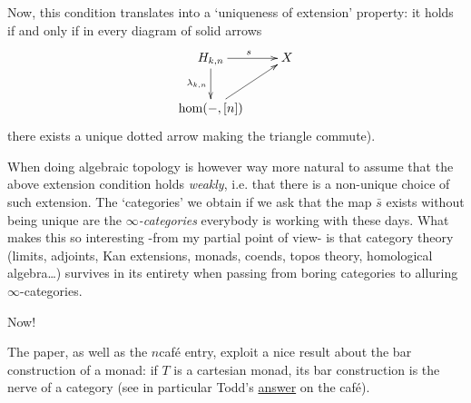 \documentclass{amsart}
\begin{document}
Now, this condition translates into a `uniqueness of extension' property: it holds if and only if in every diagram of solid arrows
\[
\xymatrix{
  H_{k,n} \ar[r]^s \ar[d]_{\lambda_{k,n}}& X \\
  \hom(-,[n])\ar[ur]
}
\]
there exists a unique dotted arrow making the triangle commute).

When doing algebraic topology is however way more natural to assume that the above extension condition holds \emph{weakly}, i.e. that there is a non-unique choice of such extension. The `categories' we obtain if we ask that the map $\bar s$ exists without being unique are the \emph{$\infty$-categories} everybody is working with these days. What makes this so interesting -from my partial point of view- is that category theory (limits, adjoints, Kan extensions, monads, coends, topos theory, homological algebra\dots) survives in its entirety when passing from boring categories to alluring $\infty$-categories.

Now!

The paper, as well as the $n$café entry, exploit a nice result about the bar construction of a monad: if $T$ is a cartesian monad, its bar construction is the nerve of a category (see in particular Todd's \href{https://golem.ph.utexas.edu/category/2007/05/on_the_bar_construction.html#c009959}{answer} on the café).
\end{document}
